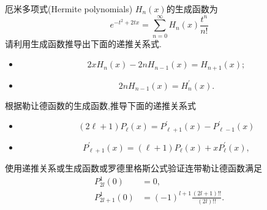 \documentclass[10pt]{article}
\newenvironment{problem}[2][]{\begin{trivlist}
\item[\hskip \labelsep {\bfseries #1}\hskip \labelsep {\bfseries #2}]}{\end{trivlist}}
\begin{document}
\renewcommand{\labelenumi}{(\arabic{enumi})}
\renewcommand{\labelenumii}{(\arabic{enumi}.\arabic{enumii})}



 




\begin{problem}{9.1}
厄米多项式(Hermite polynomials) $H_n(x)$的生成函数为
$$
e^{-t^2+2 t x}=\sum_{n=0}^{\infty} H_n(x) \frac{t^n}{n !}
$$
请利用生成函数推导出下面的递推关系式.
\begin{itemize}
  \item[(1)] $$
  2 x H_n(x)-2 n H_{n-1}(x)=H_{n+1}(x);
  $$
  \item[(2)] $$2 n H_{n-1}(x)=H_n^{\prime}(x) . $$
\end{itemize}
\end{problem}



\begin{problem}{9.2}
根据勒让德函数的生成函数,推导下面的递推关系式
\begin{itemize}
  \item[(1)] $$
  (2 \ell+1) P_\ell(x)=P_{\ell+1}^{\prime}(x)-P_{\ell-1}^{\prime}(x)
  $$
  \item[(2)]
  $$
  P_{\ell+1}^{\prime}(x)=(\ell+1) P_\ell(x)+x P_\ell^{\prime}(x),
  $$
\end{itemize}
\end{problem}
  



\begin{problem}{9.3}
  使用递推关系或生成函数或罗德里格斯公式验证连带勒让德函数满足
  $$
  \begin{aligned}
  P_{2 l}^1(0) & =0, \\
  P_{2 l+1}^1(0) & =(-1)^{l+1} \frac{(2 l+1) ! !}{(2 l) ! !}.
  \end{aligned}
  $$
\end{problem}
\end{document}
